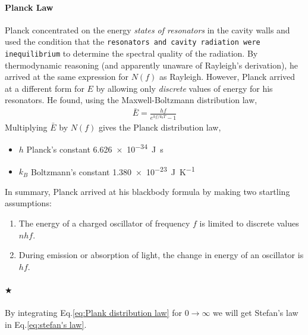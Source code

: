     \paragraph{\color{c3}Planck Law} %
    \label{par:Planck Law}
    Planck concentrated on the energy \textit{states of resonators} in the cavity walls and used the condition that the 
    \texttt{resonators and cavity radiation were inequilibrium} to determine the spectral quality of the radiation. 
    By thermodynamic reasoning (and apparently unaware of Rayleigh’s derivation), he arrived at the same expression 
    for $N( f )$ as Rayleigh. However, Planck arrived at a different form for $E$ by allowing only \textit{discrete} values of 
    energy for his resonators. He found, using the Maxwell-Boltzmann distribution law,
    \begin{align}
        \label{eq:plank average energy}
        \bar{E} = \frac{hf}{e^{hf/k_b T}-1}
    \end{align}
    Multiplying $\bar{E}$ by $N(f)$ gives the Planck distribution law,
    {\tiny \begin{itemize}
        \item $h$ Planck's constant \SI{6.626e-34}{\J\s}
        \item $k_B$ Boltzmann's constant \SI{1.380e-23}{\J\per\K}
    \end{itemize}}
    \noindent
    In summary, Planck arrived at his blackbody formula by making two startling assumptions: 
    \begin{enumerate}
        \item The energy of a charged oscillator of frequency $f$ is limited to discrete values $nhf$.
        \item During emission or absorption of light, the change in energy of an oscillator is $hf$.
    \end{enumerate}
    
    \paragraph{\color{c3}$\bigstar$} By integrating Eq.\eqref{eq:Plank distribution law} for $0 \to \infty$ we will get 
    Stefan’s law in Eq.\eqref{eq:stefan's law}.

